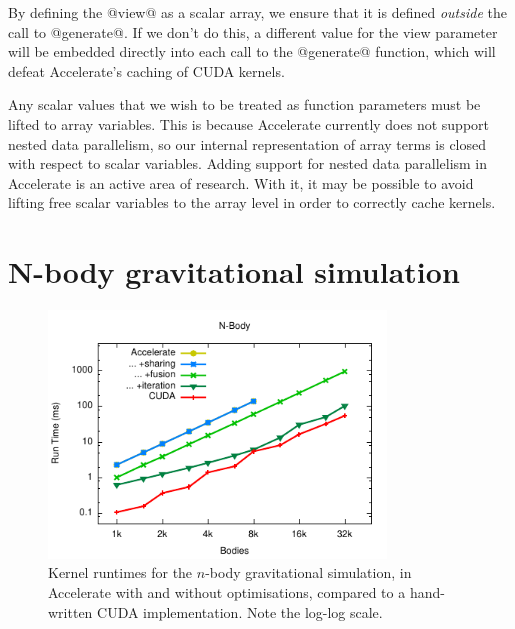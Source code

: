 By defining the @view@ as a scalar array, we ensure that it is defined
\emph{outside} the call to @generate@. If we don't do this, a different value
for the view parameter will be embedded directly into each call to the
@generate@ function, which will defeat Accelerate's caching of CUDA kernels.

Any scalar values that we wish to be treated as function parameters must be
lifted to array variables. This is because Accelerate currently does not support
nested data parallelism, so our internal representation of array terms is closed
with respect to scalar variables.
Adding support for nested data parallelism in Accelerate is an active area of
research. With it, it may be possible to avoid lifting free scalar variables to
the array level in order to correctly cache kernels.


\section{N-body gravitational simulation}
\label{sec:nbody}

\begin{figure}
    \begin{center}
        \includegraphics[width=0.8\textwidth]{images/sec-6/nbody/nbody}
    \end{center}
    \caption[N-body gravitational simulation kernel benchmarks]{Kernel runtimes
        for the $n$-body gravitational simulation, in Accelerate with and
        without optimisations, compared to a hand-written CUDA implementation.
        Note the log-log scale.}
    \label{fig:nbody}
\end{figure}

